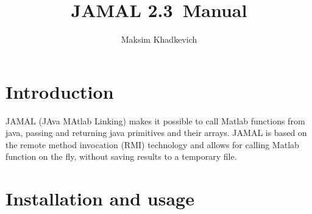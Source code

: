 \documentclass[a4paper,twoside,12pt]{report}
\def\version{2.3}
\begin{document}
\pagestyle{empty} %



\title{JAMAL \version~Manual}
\author{Maksim Khadkevich}
\maketitle



\tableofcontents %
\cleardoublepage %

\pagestyle{plain} %








\section{Introduction}\label{introduction}
JAMAL (JAva MAtlab Linking) makes it possible to call Matlab functions from java, passing and returning java primitives and their arrays. JAMAL is based on the remote method invocation (RMI) technology and allows for calling Matlab function on the fly, without saving results to a temporary file.

\section{Installation and usage}\label{installation}
\end{document}
